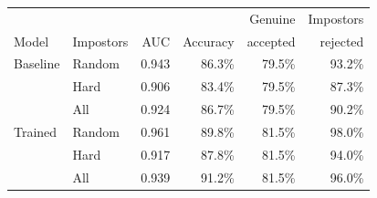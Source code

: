 \setlength{\tabcolsep}{4pt}
\begin{tabular}{@{}llrrrr@{}}
\toprule
 & & & & Genuine & Impostors \\
Model & Impostors & AUC & Accuracy & accepted & rejected \\
\midrule
Baseline & Random & 0.943 & 86.3\% & 79.5\% & 93.2\% \\
 & Hard & 0.906 & 83.4\% & 79.5\% & 87.3\% \\
 & All & 0.924 & 86.7\% & 79.5\% & 90.2\% \\
\midrule
Trained & Random & 0.961 & 89.8\% & 81.5\% & 98.0\% \\
 & Hard & 0.917 & 87.8\% & 81.5\% & 94.0\% \\
 & All & 0.939 & 91.2\% & 81.5\% & 96.0\% \\
\bottomrule
\end{tabular}
